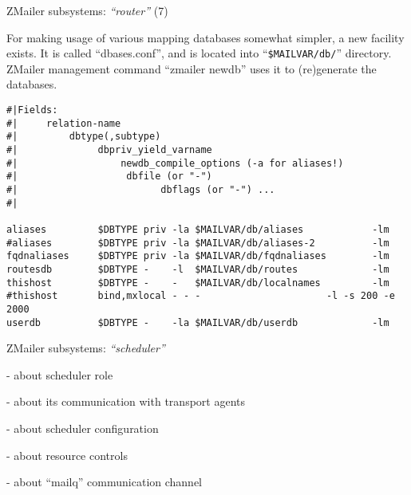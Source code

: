\documentclass[a4paper,landscape]{slides}
\newcommand{\ZM}{ZMailer}
\begin{document}
\begin{slide}
\centerline{\large \ZM{} subsystems: {\em ``router''} (7)}

For making usage of various mapping databases somewhat simpler,
a new facility exists.  It is called ``dbases.conf'', and is
located into ``\verb!$MAILVAR/db/!'' directory.
\ZM{} management command ``zmailer newdb'' uses it to (re)generate
the databases.
\tiny
\begin{verbatim}
#|Fields:
#|     relation-name
#|         dbtype(,subtype)
#|              dbpriv_yield_varname
#|                  newdb_compile_options (-a for aliases!)
#|                   dbfile (or "-")
#|                         dbflags (or "-") ...
#|

aliases         $DBTYPE priv -la $MAILVAR/db/aliases            -lm
#aliases        $DBTYPE priv -la $MAILVAR/db/aliases-2          -lm
fqdnaliases     $DBTYPE priv -la $MAILVAR/db/fqdnaliases        -lm
routesdb        $DBTYPE -    -l  $MAILVAR/db/routes             -lm
thishost        $DBTYPE -    -   $MAILVAR/db/localnames         -lm
#thishost       bind,mxlocal - - -                      -l -s 200 -e 2000
userdb          $DBTYPE -    -la $MAILVAR/db/userdb             -lm
\end{verbatim}

\vfill
\end{slide}




\begin{slide}
\centerline{\large \ZM{} subsystems: {\em ``scheduler''}}

- about scheduler role

- about its communication with transport agents

- about scheduler configuration

- about resource controls

- about ``mailq'' communication channel

\vfill
\end{slide}

\end{document}
